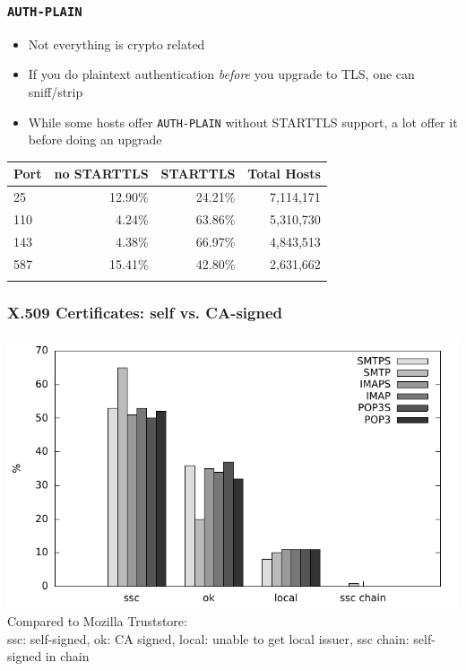 \documentclass[14pt,aspectratio=43]{beamer}
\begin{document}
\begin{frame}
  \frametitle{\texttt{AUTH-PLAIN}}
  \begin{itemize}
    \item Not everything is crypto related
    \item If you do plaintext authentication \emph{before} you upgrade to TLS, one can sniff/strip
    \item While some hosts offer \texttt{AUTH-PLAIN} without STARTTLS support, a lot offer it before doing an upgrade
  \end{itemize}
\small
\begin{table}
\centering
\begin{tabular}{lrrr}
\hline
Port   & no STARTTLS  & STARTTLS & Total Hosts\\
\hline
25  & 12.90\%         & 24.21\%  & 7,114,171 \\
110 & 4.24\%          & 63.86\%  & 5,310,730 \\
143 & 4.38\%          & 66.97\%  & 4,843,513 \\
587 & 15.41\%         & 42.80\%  & 2,631,662 \\
\hline \\
\end{tabular}
\end{table}
\end{frame}

\begin{frame}
  \frametitle{X.509 Certificates: self vs. CA-signed}
  \begin{center}
    \includegraphics*[scale=0.74]{images/plot-mozilla-trust-store.pdf}\\
  \tiny{Compared to Mozilla Truststore:\\ssc: self-signed, ok: CA signed, local: unable to get local issuer, ssc chain: self-signed in chain}
  \end{center}
\end{frame}
\end{document}
